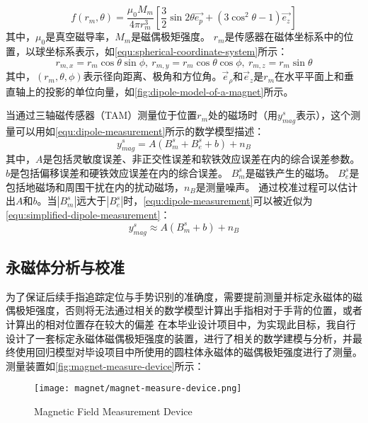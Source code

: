 \begin{equation}
    \label{equ:dipole-model}
    f(r_m, \theta) = \frac{\mu_0 M_m}{4\pi r_m^3}[\frac{3}{2}\sin{2\theta}\vec{e_p} + (3\cos^2{\theta} - 1)\vec{e_z}]
\end{equation}
其中，$\mu_0$是真空磁导率，$M_m$是磁偶极矩强度。
$r_m$是传感器在磁体坐标系中的位置，以球坐标系表示，如\autoref{equ:spherical-coordinate-system}所示：
\begin{equation}
    \label{equ:spherical-coordinate-system}
    r_{m,x} = r_m\cos{\theta}\sin{\phi},\ r_{m,y} = r_m\cos{\theta}\cos{\phi},\ r_{m,z} = r_m\sin{\theta}
\end{equation}
其中，$(r_m, \theta, \phi)$表示径向距离、极角和方位角。$\vec{e}_{\rho}$和$\vec{e}_z$是$r_m$在水平平面上和垂直轴上的投影的单位向量，如\autoref{fig:dipole-model-of-a-magnet}所示。

当通过三轴磁传感器（TAM）测量位于位置$r_m$处的磁场时（用$y^s_{mag}$表示），这个测量可以用如\autoref{equ:dipole-measurement}所示的数学模型描述：
\begin{equation}
    \label{equ:dipole-measurement}
    y_{mag}^s = A(B_m^s + B_e^s + b) + n_{B}
\end{equation}
其中，$A$是包括灵敏度误差、非正交性误差和软铁效应误差在内的综合误差参数。
$b$是包括偏移误差和硬铁效应误差在内的综合误差。
$B_m^s$是磁铁产生的磁场。
$B_e^s$是包括地磁场和周围干扰在内的扰动磁场，$n_B$是测量噪声。
通过校准过程可以估计出$A$和$b$。当$|B_m^s|$远大于$|B_e^s|$时，\autoref{equ:dipole-measurement}可以被近似为\autoref{equ:simplified-dipole-measurement}：
\begin{equation}
    \label{equ:simplified-dipole-measurement}
    y_{mag}^s \approx A(B_m^s + b) + n_{B}
\end{equation}

\subsection{永磁体分析与校准}
为了保证后续手指追踪定位与手势识别的准确度，需要提前测量并标定永磁体的磁偶极矩强度，否则将无法通过相关的数学模型计算出手指相对于手背的位置，或者计算出的相对位置存在较大的偏差
在本毕业设计项目中，为实现此目标，我自行设计了一套标定永磁体磁偶极矩强度的装置，进行了相关的数学建模与分析，并最终使用回归模型对毕设项目中所使用的圆柱体永磁体的磁偶极矩强度进行了测量。
测量装置如\autoref{fig:magnet-measure-device}所示：

\begin{figure}[H]
    \centering
    \texttt{[image: magnet/magnet-measure-device.png]}
    \caption{\label{fig:magnet-measure-device}Magnetic Field Measurement Device}
\end{figure}

